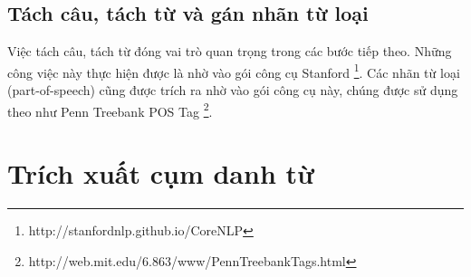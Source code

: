 \documentclass[12pt]{report}
\begin{document}
		\subsection*{Tách câu, tách từ và gán nhãn từ loại}
			\par Việc tách câu, tách từ đóng vai trò quan trọng trong các bước tiếp theo. Những công việc này thực hiện được là nhờ vào gói công cụ Stanford \footnote{http://stanfordnlp.github.io/CoreNLP}. Các nhãn từ loại (part-of-speech) cũng được trích ra nhờ vào gói công cụ này, chúng được sử dụng theo như Penn Treebank POS Tag \footnote{http://web.mit.edu/6.863/www/PennTreebankTags.html}.

		\section{Trích xuất cụm danh từ}
\end{document}
